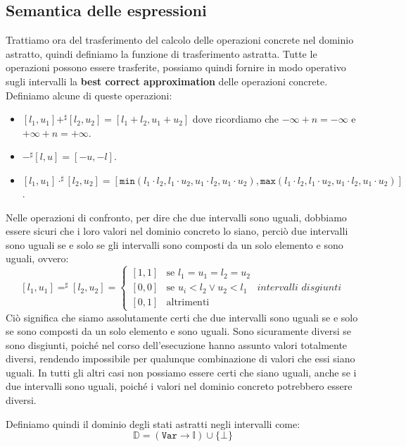 \subsection{Semantica delle espressioni}
Trattiamo ora del trasferimento del calcolo delle operazioni concrete nel 
dominio astratto, quindi definiamo la funzione di trasferimento astratta.
Tutte le operazioni possono essere trasferite, possiamo quindi fornire
in modo operativo sugli intervalli la \textbf{best correct approximation}
delle operazioni concrete. Definiamo alcune di queste operazioni:
\begin{itemize}
    \item $[l_1, u_1] +^\sharp [l_2, u_2] = [l_1 + l_2, u_1 + u_2]$ dove ricordiamo che 
    $-\infty + n = -\infty$ e $+\infty + n = +\infty$.
    \item $-^\sharp[l, u] = [-u, -l]$.
    \item $[l_1, u_1] \cdot^\sharp [l_2, u_2] = 
    [\texttt{min}(l_1 \cdot l_2, l_1 \cdot u_2, u_1 \cdot l_2, u_1 \cdot u_2), 
    \texttt{max}(l_1 \cdot l_2, l_1 \cdot u_2, u_1 \cdot l_2, u_1 \cdot u_2)]$.  
\end{itemize}
Nelle operazioni di confronto, per dire che due intervalli sono uguali,
dobbiamo essere sicuri che i loro valori nel dominio concreto lo 
siano, perciò due intervalli sono uguali se e solo se gli intervalli 
sono composti da un solo elemento e sono uguali, ovvero:
\[
  [l_1, u_1] =^\sharp [l_2, u_2] =
  \begin{cases}
    [1, 1] & \text{se } l_1 = u_1 = l_2 = u_2 \\
    [0, 0] & \text{se } u_i < l_2 \lor u_2 < l_1 \quad \textit{intervalli 
    disgiunti}\\
    [0, 1] & \text{altrimenti}
   \end{cases}
\]
Ciò significa che siamo assolutamente certi che due intervalli
sono uguali se e solo se sono composti da un solo elemento e sono uguali.
Sono sicuramente diversi se sono disgiunti, poiché nel corso dell'esecuzione 
hanno assunto valori totalmente diversi, rendendo impossibile per 
qualunque combinazione di valori che essi siano uguali. In tutti gli 
altri casi non possiamo essere certi che siano uguali, anche se i due 
intervalli sono uguali, poiché i valori nel dominio concreto potrebbero
essere diversi.

Definiamo quindi il dominio degli stati astratti negli intervalli come:
\[
  \mathbb{D} = (\texttt{Var} \to \mathbb{I}) \cup \{\bot\}
\]
